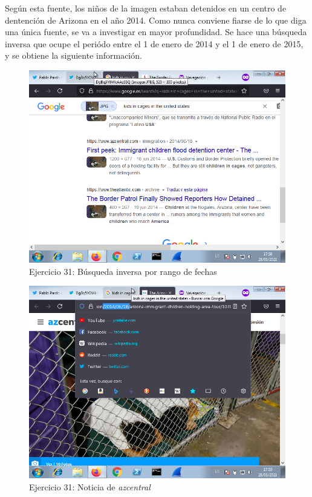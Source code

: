 \documentclass[11pt]{article}
\begin{document}
Según esta fuente, los niños de la imagen estaban detenidos en un centro de dentención de Arizona en el año 2014. Como nunca conviene fiarse de lo que diga una única fuente, se va a investigar en mayor profundidad. Se hace una búsqueda inversa que ocupe el periódo entre el 1 de enero de 2014 y el 1 de enero de 2015, y se obtiene la siguiente información.

\begin{figure}[H]
    \caption{Ejercicio 31: Búsqueda inversa por rango de fechas}
  \centering
    \includegraphics[scale=0.8]{p05/e31-6.png}
\end{figure}

\begin{figure}[H]
    \caption{Ejercicio 31: Noticia de \textit{azcentral}}
  \centering
    \includegraphics[scale=0.8]{p05/e31-4.png}
\end{figure}
\end{document}
